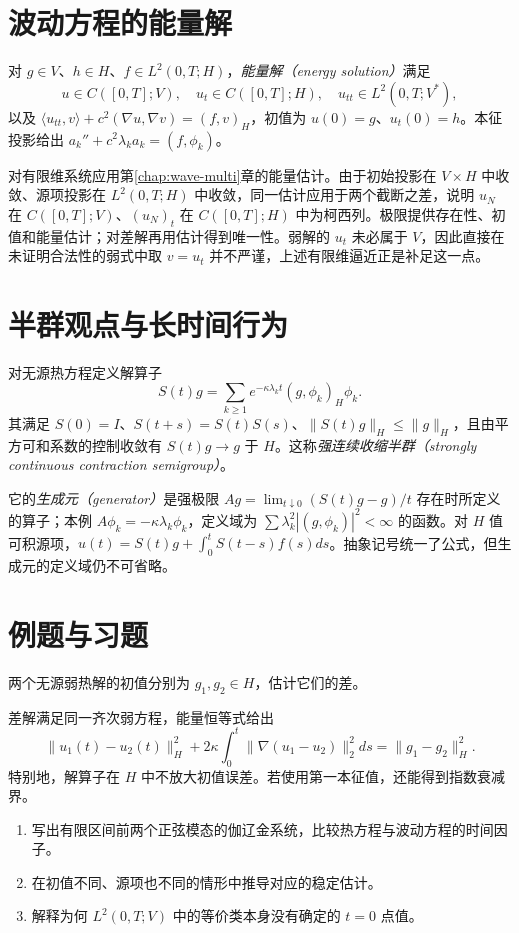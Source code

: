 \section{波动方程的能量解}
对 $g\in V$、$h\in H$、$f\in L^2(0,T;H)$，\emph{能量解（energy solution）}满足
\[
 u\in C([0,T];V),\quad u_t\in C([0,T];H),\quad u_{tt}\in L^2(0,T;V^*),
\]
以及 $\langle u_{tt},v\rangle+c^2(\nabla u,\nabla v)=(f,v)_H$，初值为 $u(0)=g$、$u_t(0)=h$。本征投影给出 $a_k''+c^2\lambda_ka_k=(f,\phi_k)$。

对有限维系统应用第\ref{chap:wave-multi}章的能量估计。由于初始投影在 $V\times H$ 中收敛、源项投影在 $L^2(0,T;H)$ 中收敛，同一估计应用于两个截断之差，说明 $u_N$ 在 $C([0,T];V)$、$(u_N)_t$ 在 $C([0,T];H)$ 中为柯西列。极限提供存在性、初值和能量估计；对差解再用估计得到唯一性。弱解的 $u_t$ 未必属于 $V$，因此直接在未证明合法性的弱式中取 $v=u_t$ 并不严谨，上述有限维逼近正是补足这一点。

\section{半群观点与长时间行为}
对无源热方程定义解算子
\[
 S(t)g=\sum_{k\ge1}e^{-\kappa\lambda_kt}(g,\phi_k)_H\phi_k.
\]
其满足 $S(0)=I$、$S(t+s)=S(t)S(s)$、$\|S(t)g\|_H\le\|g\|_H$，且由平方可和系数的控制收敛有 $S(t)g\to g$ 于 $H$。这称\emph{强连续收缩半群（strongly continuous contraction semigroup）}。

它的\emph{生成元（generator）}是强极限 $Ag=\lim_{t\downarrow0}(S(t)g-g)/t$ 存在时所定义的算子；本例 $A\phi_k=-\kappa\lambda_k\phi_k$，定义域为 $\sum\lambda_k^2|(g,\phi_k)|^2<\infty$ 的函数。对 $H$ 值可积源项，$u(t)=S(t)g+\int_0^tS(t-s)f(s)ds$。抽象记号统一了公式，但生成元的定义域仍不可省略。

\section{例题与习题}
\begin{example}
两个无源弱热解的初值分别为 $g_1,g_2\in H$，估计它们的差。
\end{example}
\begin{solve}
差解满足同一齐次弱方程，能量恒等式给出
\[
 \|u_1(t)-u_2(t)\|_H^2+
 2\kappa\int_0^t\|\nabla(u_1-u_2)\|_2^2ds=\|g_1-g_2\|_H^2.
\]
特别地，解算子在 $H$ 中不放大初值误差。若使用第一本征值，还能得到指数衰减界。
\end{solve}
\begin{enumerate}
 \item 写出有限区间前两个正弦模态的伽辽金系统，比较热方程与波动方程的时间因子。
 \item 在初值不同、源项也不同的情形中推导对应的稳定估计。
 \item 解释为何 $L^2(0,T;V)$ 中的等价类本身没有确定的 $t=0$ 点值。
\end{enumerate}

